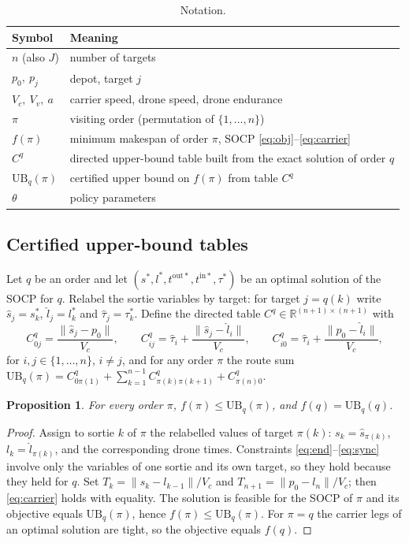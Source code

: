 \documentclass[preprint,review,12pt,authoryear]{elsarticle}
\newtheorem{proposition}{Proposition}
\newcommand{\R}{\mathbb{R}}
\newcommand{\UB}{\mathrm{UB}}
\begin{document}
\begin{table}[t]\centering\small
\caption{Notation.}\label{tab:notation}
\begin{tabular}{ll}
\toprule
Symbol & Meaning \\
\midrule
$n$ (also $J$) & number of targets \\
$p_0,\ p_j$ & depot, target $j$ \\
$V_c,\ V_v,\ a$ & carrier speed, drone speed, drone endurance \\
$\pi$ & visiting order (permutation of $\{1,\dots,n\}$) \\
$f(\pi)$ & minimum makespan of order $\pi$, SOCP \eqref{eq:obj}--\eqref{eq:carrier} \\
$C^{q}$ & directed upper-bound table built from the exact solution of order $q$ \\
$\UB_q(\pi)$ & certified upper bound on $f(\pi)$ from table $C^q$ \\
$\theta$ & policy parameters \\
\bottomrule
\end{tabular}
\end{table}

\subsection{Certified upper-bound tables}\label{sec:ubtable}
Let $q$ be an order and let $(s^*,l^*,t^{\mathrm{out}*},t^{\mathrm{in}*},\tau^*)$ be an optimal solution of
the SOCP for $q$. Relabel the sortie variables by target: for target $j=q(k)$ write $\hat s_j=s^*_k$,
$\hat l_j=l^*_k$ and $\hat\tau_j=\tau^*_k$. Define the directed table $C^q\in\R^{(n+1)\times(n+1)}$ with
\begin{equation}\label{eq:table}
C^q_{0j}=\frac{\|\hat s_j-p_0\|}{V_c},\qquad
C^q_{ij}=\hat\tau_i+\frac{\|\hat s_j-\hat l_i\|}{V_c},\qquad
C^q_{i0}=\hat\tau_i+\frac{\|p_0-\hat l_i\|}{V_c},
\end{equation}
for $i,j\in\{1,\dots,n\}$, $i\ne j$,
and for any order $\pi$ the route sum
$\UB_q(\pi)=C^q_{0\pi(1)}+\sum_{k=1}^{n-1}C^q_{\pi(k)\pi(k+1)}+C^q_{\pi(n)0}$.

\begin{proposition}\label{prop:ub}
For every order $\pi$, $f(\pi)\le \UB_q(\pi)$, and $f(q)=\UB_q(q)$.
\end{proposition}
\begin{proof}
Assign to sortie $k$ of $\pi$ the relabelled values of target $\pi(k)$: $s_k=\hat s_{\pi(k)}$,
$l_k=\hat l_{\pi(k)}$, and the corresponding drone times. Constraints \eqref{eq:end}--\eqref{eq:sync} involve
only the variables of one sortie and its own target, so they hold because they held for $q$. Set
$T_k=\|s_k-l_{k-1}\|/V_c$ and $T_{n+1}=\|p_0-l_n\|/V_c$; then \eqref{eq:carrier} holds with equality. The
solution is feasible for the SOCP of $\pi$ and its objective equals $\UB_q(\pi)$, hence
$f(\pi)\le\UB_q(\pi)$. For $\pi=q$ the carrier legs of an optimal solution are tight, so the objective equals
$f(q)$.
\end{proof}
\end{document}
